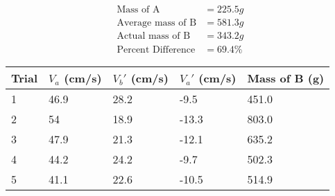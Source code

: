 \begin{equation*}
    \begin{aligned}
        \text{Mass of A}&=225.5g \\
        \text{Average mass of B}&=581.3g \\
        \text{Actual mass of B}&=343.2g \\
        \text{Percent Difference}&=69.4\%
    \end{aligned}    
\end{equation*}
\begin{table}[H]
    \begin{tabular}{|l|l|l|l|l|}
    \hline
    Trial & $V_a$ (cm/s) & $V_b'$ (cm/s) & $V_a'$ (cm/s) & Mass of B (g) \\ \hline
    1     & 46.9        & 28.2        & -9.5         & 451.0         \\ \hline
    2     & 54          & 18.9        & -13.3        & 803.0         \\ \hline
    3     & 47.9        & 21.3        & -12.1        & 635.2         \\ \hline
    4     & 44.2        & 24.2        & -9.7         & 502.3         \\ \hline
    5     & 41.1        & 22.6        & -10.5        & 514.9         \\ \hline    
    \end{tabular}
    \end{table}